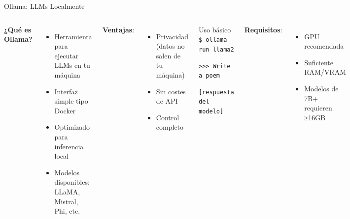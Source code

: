 \begin{frame}{Ollama: LLMs Localmente}

\begin{columns}
\textbf{¿Qué es Ollama?}
\begin{itemize}
    \item Herramienta para ejecutar LLMs en tu máquina
    \item Interfaz simple tipo Docker
    \item Optimizado para inferencia local
    \item Modelos disponibles: LLaMA, Mistral, Phi, etc.
\end{itemize}

\vspace{0.5em}

\textbf{Ventajas}:
\begin{itemize}
    \item Privacidad (datos no salen de tu máquina)
    \item Sin costes de API
    \item Control completo
\end{itemize}

\begin{block}{Uso básico}
\small
\texttt{\$ ollama run llama2}

\vspace{0.3em}
\texttt{>>> Write a poem}

\texttt{[respuesta del modelo]}
\end{block}

\vspace{0.5em}

\textbf{Requisitos}:
\begin{itemize}
    \item GPU recomendada
    \item Suficiente RAM/VRAM
    \item Modelos de 7B+ requieren ≥16GB
\end{itemize}

\end{columns}

\end{frame}



